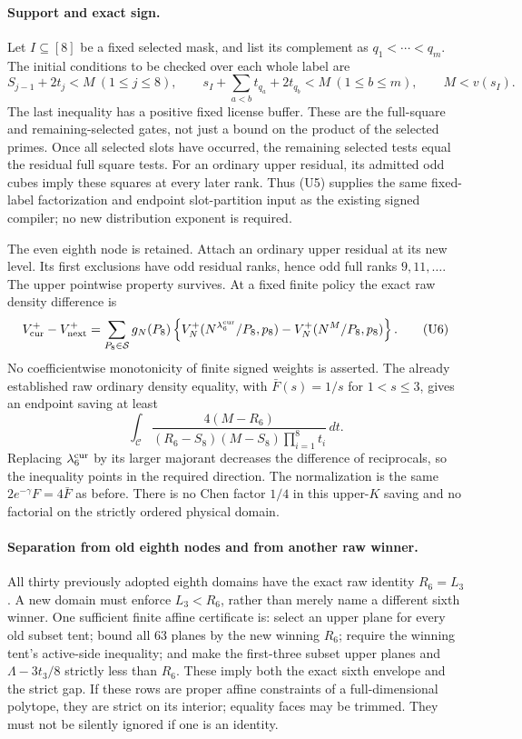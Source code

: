 \paragraph{Support and exact sign.}
Let $I\subseteq[8]$ be a fixed selected mask, and list its complement
as $q_1<\cdots<q_m$. The initial conditions to be checked over each
whole label are
\[
 S_{j-1}+2t_j<M\ (1\le j\le8),\qquad
 s_I+\sum_{a<b}t_{q_a}+2t_{q_b}<M\ (1\le b\le m),
 \qquad M<v(s_I).                                    \tag{U5}
\]
The last inequality has a positive fixed license buffer. These are
the full-square and remaining-selected gates, not just a bound on
the product of the selected primes. Once all selected slots have
occurred, the remaining selected tests equal the residual full
square tests. For an ordinary upper residual, its admitted odd cubes
imply these squares at every later rank. Thus (U5) supplies the same
fixed-label factorization and endpoint slot-partition input as the
existing signed compiler; no new distribution exponent is required.

The even eighth node is retained. Attach an ordinary upper residual
at its new level. Its first exclusions have odd residual ranks, hence
odd full ranks $9,11,\ldots$. The upper pointwise property survives.
At a fixed finite policy the exact raw density difference is
\[
 V^{+}_{\rm cur}-V^{+}_{\rm next}
 =\sum_{P_8\in\mathcal S}g_N(P_8)
 \left\{V_N^+(N^{\lambda_6^{\rm cur}}/P_8,p_8)
              -V_N^+(N^M/P_8,p_8)\right\}.            \tag{U6}
\]
No coefficientwise monotonicity of finite signed weights is asserted.
The already established raw ordinary density equality, with
$\bar F(s)=1/s$ for $1<s\le3$, gives an endpoint saving at least
\[
 \boxed{\int_{\mathcal C}
 \frac{4(M-R_6)}{(R_6-S_8)(M-S_8)\prod_{i=1}^8t_i}\,dt.} \tag{U7}
\]
Replacing $\lambda_6^{\rm cur}$ by its larger majorant decreases
the difference of reciprocals, so the inequality points in the
required direction. The normalization is the same
$2e^{-\gamma}F=4\bar F$ as before. There is no Chen factor $1/4$
in this upper-$K$ saving and no factorial on the strictly ordered
physical domain.

\paragraph{Separation from old eighth nodes and from another raw winner.}
All thirty previously adopted eighth domains have the exact raw
identity $R_6=L_3$. A new domain must enforce $L_3<R_6$, rather than
merely name a different sixth winner. One sufficient finite affine
certificate is: select an upper plane for every old subset tent;
bound all 63 planes by the new winning $R_6$; require the winning
tent's active-side inequality; and make the first-three subset
upper planes and $\Lambda-3t_3/8$ strictly less than $R_6$.
These imply both the exact sixth envelope and the strict gap.
If these rows are proper affine constraints of a full-dimensional
polytope, they are strict on its interior; equality faces may be
trimmed. They must not be silently ignored if one is an identity.

